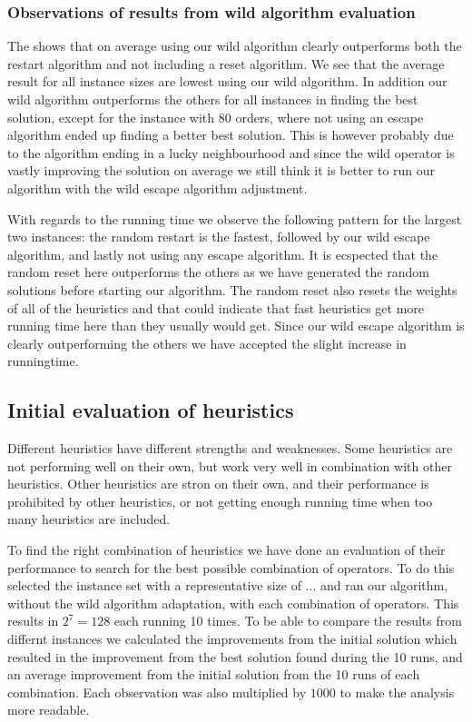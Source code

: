 \documentclass[../main.tex]{subfiles}
\begin{document}
\subsubsection{Observations of results from wild algorithm evaluation}
The  shows that on average using our wild algorithm clearly outperforms both the restart algorithm and not including a reset algorithm. 
We see that the average result for all instance sizes are lowest using our wild algorithm. 
In addition our wild algorithm outperforms the others for all instances in finding the best solution, except for the instance with 80 orders, where not using an escape algorithm ended up finding a better best solution. 
This is however probably due to the algorithm ending in a lucky neighbourhood and since the wild operator is vastly improving the solution on average we still think it is better to run our algorithm with the wild escape algorithm adjustment.
\par
With regards to the running time we observe the following pattern for the largest two instances: the random restart is the fastest, followed by our wild escape algorithm, and lastly not using any escape algorithm. It is ecspected that the random reset here outperforms the others as we have generated the random solutions before starting our algorithm. The random reset also resets the weights of all of the heuristics and that could indicate that fast heuristics get more running time here than they usually would get. Since our wild escape algorithm is clearly outperforming the others we have accepted the slight increase in runningtime.  

\subsection{Initial evaluation of heuristics}
\label{sec:evalH1}
Different heuristics have different strengths and weaknesses. Some heuristics are not performing well on their own, but work very well in combination with other heuristics. 
Other heuristics are stron on their own, and their performance is prohibited by other heuristics, or not getting enough running time when too many heuristics are included.

\par To find the right combination of heuristics we have done an evaluation of their performance to search for the best possible combination of operators. To do this selected the instance set with a representative size of ... and ran our algorithm, without the wild algorithm adaptation, with each combination of operators.
This results in $2^7 = 128$ each running 10 times. To be able to compare the results from differnt instances we calculated the improvements from the initial solution which resulted in the improvement from the best solution found during the 10 runs, and an average improvement from the initial solution from the 10 runs of each combination. Each observation was also multiplied by $1000$ to make the analysis more readable. 
\end{document}
